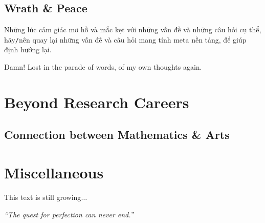 \documentclass{article}
\numberwithin{equation}{section}
\begin{document}
\subsection{Wrath \& Peace}
Những lúc cảm giác mơ hồ và mắc kẹt với những vấn đề và những câu hỏi cụ thể, hãy\texttt{/}nên quay lại những vấn đề và câu hỏi mang tính meta nền tảng, để giúp định hướng lại.

Damn! Lost in the parade of words, of my own thoughts again.

\section{Beyond Research Careers}

\subsection{Connection between Mathematics \& Arts}

\section{Miscellaneous}
This text is still growing$\ldots$
\begin{flushright}
	\textit{``The quest for perfection can never end.''}
\end{flushright}

\end{document}
